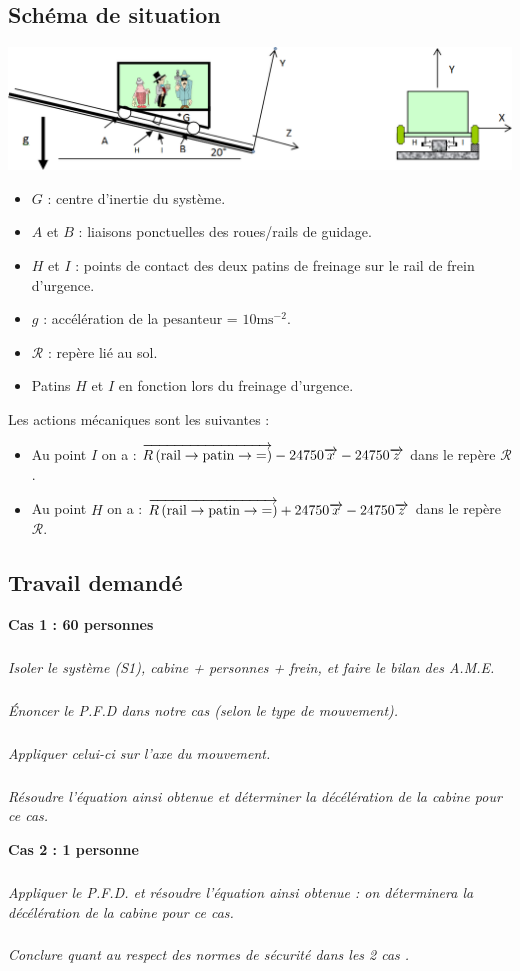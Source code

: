 \documentclass[10pt,fleqn]{book} %
\begin{document}
\begin{multicols}{2}
\subsection*{Schéma de situation}
\begin{center}
\includegraphics[width=\linewidth]{images/fig_07}
\end{center}

\begin{itemize}
\item $G$ : centre d’inertie du système.
\item $A$ et $B$ : liaisons ponctuelles des roues/rails de guidage.
\item $H$ et $I$ : points de contact des deux patins de freinage sur le rail de frein d’urgence.
\item $g$ : accélération de la pesanteur = $10 \text{ms}^{-2}$.
\item $\mathcal{R}$ : repère lié au sol.
\item Patins $H$ et $I$ en fonction lors du freinage d’urgence.
\end{itemize}
Les actions mécaniques sont les suivantes :
\begin{itemize}
\item Au point $I$ on a : $\overrightarrow{R\left( {\text{rail} \rightarrow \text{patin}} \rightarrow {=}\right)} -24750 \overrightarrow{x}  -24750 \overrightarrow{z}$ dans le repère $\mathcal{R}$. 
\item Au point $H$ on a : $\overrightarrow{R\left( {\text{rail} \rightarrow \text{patin}} \rightarrow {=}\right)} +24750 \overrightarrow{x}  -24750 \overrightarrow{z}$ dans le repère $\mathcal{R}$.
\end{itemize}

\subsection*{Travail demandé}

\textbf{Cas 1 : 60 personnes}

\subparagraph{}
\textit{Isoler le système (S1), cabine + personnes + frein, et faire le bilan des A.M.E.}

\subparagraph{}
\textit{Énoncer le P.F.D dans notre cas (selon le type de mouvement).}

\subparagraph{}
\textit{Appliquer celui-ci sur l’axe du mouvement.}

\subparagraph{}
\textit{Résoudre l’équation ainsi obtenue et déterminer la décélération  de la cabine pour ce cas.}

\textbf{Cas 2 : 1 personne}

\subparagraph{}
\textit{Appliquer le P.F.D. et résoudre l’équation ainsi obtenue : on déterminera la décélération  de la cabine pour ce cas.}

\subparagraph{}
\textit{Conclure quant au respect des normes de sécurité dans les 2 cas .}

\end{multicols}
\end{document}
